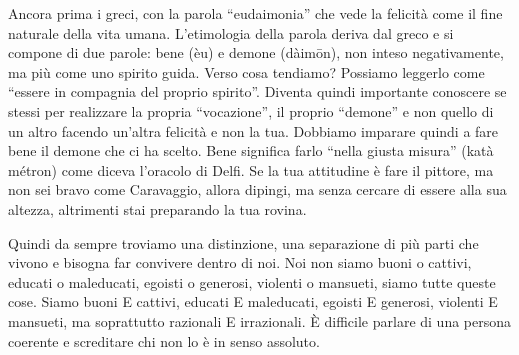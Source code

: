 \documentclass[12pt]{book} %
\begin{document}
Ancora prima i greci, con la parola “eudaimonia” che vede la felicità come il fine naturale della vita umana.
L'etimologia della parola deriva dal greco e si compone di due parole: bene (èu) e demone
(dàimōn), non inteso negativamente, ma più come uno spirito guida. Verso cosa tendiamo? Possiamo leggerlo come “essere
in compagnia del proprio spirito”. Diventa quindi importante conoscere se stessi per realizzare la propria “vocazione”,
il proprio “demone” e non quello di un altro facendo un'altra felicità e non la tua. Dobbiamo
imparare quindi a fare bene il demone che ci ha scelto. Bene significa farlo “nella giusta misura” (katà métron) come
diceva l'oracolo di Delfi. Se la tua attitudine è fare il pittore, ma non sei bravo come
Caravaggio, allora dipingi, ma senza cercare di essere alla sua altezza, altrimenti stai preparando la tua rovina.

Quindi da sempre troviamo una distinzione, una separazione di più parti che vivono e bisogna far convivere dentro di
noi. Noi non siamo buoni o cattivi, educati o maleducati, egoisti o generosi, violenti o mansueti, siamo tutte queste
cose. Siamo buoni E cattivi, educati E maleducati, egoisti E generosi, violenti E mansueti, ma soprattutto razionali E
irrazionali. È difficile parlare di una persona coerente e screditare chi non lo è in senso assoluto.
\end{document}
